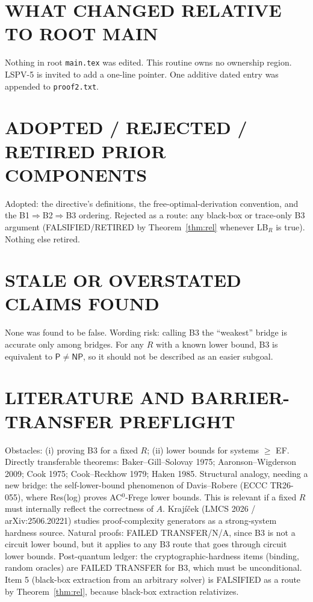 \documentclass[11pt]{article}
\theoremstyle{definition}
\theoremstyle{remark}
\newcommand{\NP}{\mathsf{NP}}
\newcommand{\Pc}{\mathsf{P}}
\begin{document}
\section*{WHAT CHANGED RELATIVE TO ROOT MAIN}
Nothing in root \texttt{main.tex} was edited. This routine owns no ownership region.
LSPV-5 is invited to add a one-line pointer. One additive dated entry was appended to
\texttt{proof2.txt}.

\section*{ADOPTED / REJECTED / RETIRED PRIOR COMPONENTS}
Adopted: the directive's definitions, the free-optimal-derivation convention, and the
B1$\Rightarrow$B2$\Rightarrow$B3 ordering. Rejected as a route: any black-box or trace-only
B3 argument (FALSIFIED/RETIRED by Theorem~\ref{thm:rel} whenever LB$_R$ is true). Nothing else retired.

\section*{STALE OR OVERSTATED CLAIMS FOUND}
None was found to be false. Wording risk: calling B3 the ``weakest'' bridge is accurate only among
bridges. For any $R$ with a known lower bound, B3 is equivalent to $\Pc\neq\NP$, so it should
not be described as an easier subgoal.

\section*{LITERATURE AND BARRIER-TRANSFER PREFLIGHT}
Obstacles: (i) proving B3 for a fixed $R$; (ii) lower bounds for systems $\ge$ EF.
Directly transferable theorems: Baker--Gill--Solovay 1975; Aaronson--Wigderson 2009;
Cook 1975; Cook--Reckhow 1979; Haken 1985. Structural analogy, needing a new bridge:
the self-lower-bound phenomenon of Davis--Robere (ECCC TR26-055), where Res(log) proves
AC$^0$-Frege lower bounds. This is relevant if a fixed $R$ must internally reflect the
correctness of $A$. Krajíček (LMCS 2026 / arXiv:2506.20221) studies proof-complexity
generators as a strong-system hardness source. Natural proofs: FAILED TRANSFER/N/A, since
B3 is not a circuit lower bound, but it applies to any B3 route that goes through circuit
lower bounds. Post-quantum ledger: the cryptographic-hardness items (binding,
random oracles) are FAILED TRANSFER for B3, which must be unconditional. Item 5
(black-box extraction from an arbitrary solver) is FALSIFIED as a route by
Theorem~\ref{thm:rel}, because black-box extraction relativizes.
\end{document}
